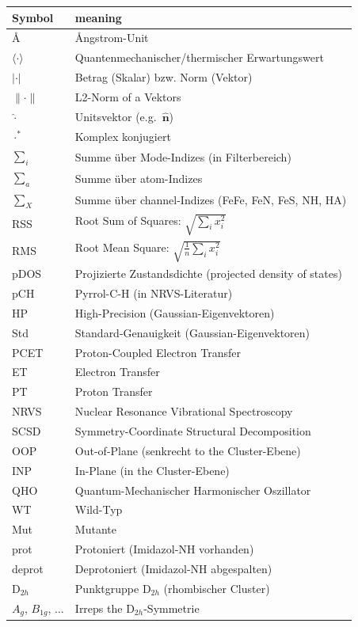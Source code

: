 \documentclass[11pt,a4paper,twoside]{article}
\providecommand{\angstrom}{\text{\AA}}    %
\theoremstyle{remark}
\begin{document}
\begin{tabular}{p{2cm} p{8.5cm}}
  \toprule
  \textbf{Symbol} & \textbf{meaning} \\
  \midrule
  $\angstrom$    & \AA{}ngstrom-Unit \\
  $\langle\cdot\rangle$ & Quantenmechanischer/thermischer Erwartungswert \\
  $|\cdot|$      & Betrag (Skalar) bzw. Norm (Vektor) \\
  $\|\cdot\|$    & L2-Norm of a Vektors \\
  $\hat{\cdot}$  & Unitsvektor (e.g.\ $\hat{\mathbf{n}}$) \\
  $\cdot^*$      & Komplex konjugiert \\
  $\sum_i$       & Summe \"uber Mode-Indizes (in Filterbereich) \\
  $\sum_a$       & Summe \"uber atom-Indizes \\
  $\sum_X$       & Summe \"uber channel-Indizes (FeFe, FeN, FeS, NH, HA) \\
  RSS            & Root Sum of Squares: $\sqrt{\sum_i x_i^2}$ \\
  RMS            & Root Mean Square: $\sqrt{\frac{1}{n}\sum_i x_i^2}$ \\
  pDOS           & Projizierte Zustandsdichte (projected density of states) \\
  pCH            & Pyrrol-C-H (in NRVS-Literatur) \\
  HP             & High-Precision (Gaussian-Eigenvektoren) \\
  Std            & Standard-Genauigkeit (Gaussian-Eigenvektoren) \\
  PCET           & Proton-Coupled Electron Transfer \\
  ET             & Electron Transfer \\
  PT             & Proton Transfer \\
  NRVS           & Nuclear Resonance Vibrational Spectroscopy \\
  SCSD           & Symmetry-Coordinate Structural Decomposition \\
  OOP            & Out-of-Plane (senkrecht to the Cluster-Ebene) \\
  INP            & In-Plane (in the Cluster-Ebene) \\
  QHO            & Quantum-Mechanischer Harmonischer Oszillator \\
  WT             & Wild-Typ \\
  Mut            & Mutante \\
  prot           & Protoniert (Imidazol-NH vorhanden) \\
  deprot         & Deprotoniert (Imidazol-NH abgespalten) \\
  D$_{2h}$       & Punktgruppe D$_{2h}$ (rhombischer Cluster) \\
  $A_g$, $B_{1g}$, $\ldots$ & Irreps the D$_{2h}$-Symmetrie \\
  \bottomrule
\end{tabular}
\end{document}
